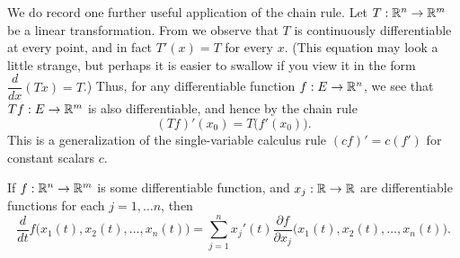 \begin{note}
  We do record one further useful application of the chain rule.
  Let \(T : \mathbb{R}^n \to \mathbb{R}^m\) be a linear transformation.
  From  we observe that \(T\) is continuously differentiable at every point, and in fact \(T'(x) = T\) for every \(x\).
  (This equation may look a little strange, but perhaps it is easier to swallow if you view it in the form \(\dfrac{d}{dx} (Tx) = T\).)
  Thus, for any differentiable function \(f : E \to \mathbb{R}^n\), we see that \(T f : E \to \mathbb{R}^m\) is also differentiable, and hence by the chain rule
  \[
    (T f)'(x_0) = T\big(f'(x_0)\big).
  \]
  This is a generalization of the single-variable calculus rule \((cf)' = c(f')\) for constant scalars \(c\).
\end{note}

\begin{ac}\label{ii:ac:6.4.1}
  If \(f : \mathbb{R}^n \to \mathbb{R}^m\) is some differentiable function, and \(x_j : \mathbb{R} \to \mathbb{R}\) are differentiable functions for each \(j = 1, \dots n\), then
  \[
    \dfrac{d}{dt} f\big(x_1(t), x_2(t), \dots, x_n(t)\big) = \sum_{j = 1}^n x_j'(t) \dfrac{\partial f}{\partial x_j} \big(x_1(t), x_2(t), \dots, x_n(t)\big).
  \]
\end{ac}

